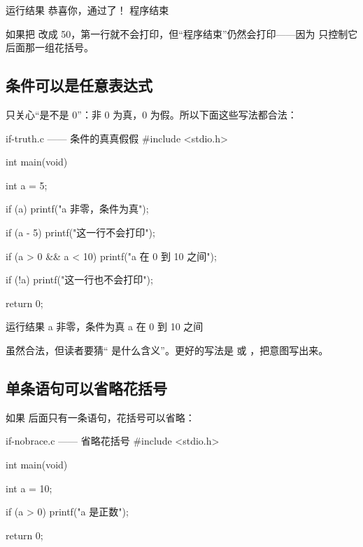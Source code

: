 \begin{outbox}{运行结果}
恭喜你，通过了！
程序结束
\end{outbox}

如果把  改成 50，第一行就不会打印，但“程序结束”仍然会打印——因为  只控制它后面那一组花括号。

\subsection{条件可以是任意表达式}

 只关心“是不是 0”：非 0 为真，0 为假。所以下面这些写法都合法：

\begin{codebox}{if-truth.c —— 条件的真真假假}
#include <stdio.h>

int main(void)
{
    int a = 5;

    if (a) {
        printf("a 非零，条件为真\n");
    }

    if (a - 5) {
        printf("这一行不会打印\n");
    }

    if (a > 0 && a < 10) {
        printf("a 在 0 到 10 之间\n");
    }

    if (!a) {
        printf("这一行也不会打印\n");
    }

    return 0;
}
\end{codebox}

\begin{outbox}{运行结果}
a 非零，条件为真
a 在 0 到 10 之间
\end{outbox}

\begin{tipbox}
 虽然合法，但读者要猜“ 是什么含义”。更好的写法是  或 ，把意图写出来。
\end{tipbox}

\subsection{单条语句可以省略花括号}

如果  后面只有一条语句，花括号可以省略：

\begin{codebox}{if-nobrace.c —— 省略花括号}
#include <stdio.h>

int main(void)
{
    int a = 10;

    if (a > 0)
        printf("a 是正数\n");

    return 0;
}
\end{codebox}

